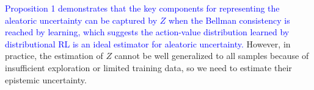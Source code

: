 \documentclass{article}
\newcommand{\horizon}{T_{H}}
\newcommand{\state}{s}
\newcommand{\action}{a}
\newcommand{\transition}{t}
\newcommand{\reward}{r}
\newcommand{\dataset}{\mathcal{D}}
\newcommand{\expect}{\mathbb{E}}
\newtheorem{proposition}{Proposition}
\DeclareMathOperator*{\argmax}{argmax}
\begin{document}
\textcolor{blue}{Proposition 1 demonstrates that the key components for representing the aleatoric uncertainty can be captured by $Z$ when the Bellman consistency is reached by learning, which suggests the action-value distribution learned by distributional RL is an ideal estimator for aleatoric uncertainty.}  However, in practice,  the estimation of $Z$ cannot be well generalized to all samples because of insufficient exploration or limited training data, so we need to estimate their epistemic uncertainty. 



\end{document}
